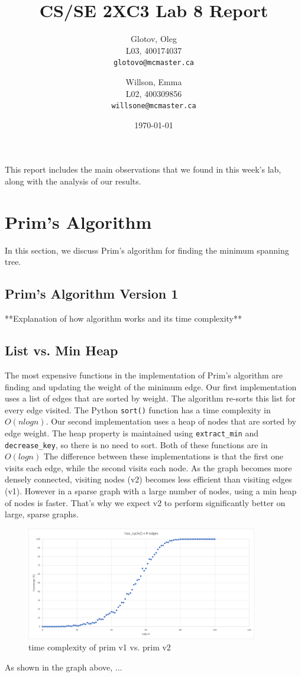 \documentclass[12pt]{article}
\title{CS/SE 2XC3 Lab 8 Report}
\author{
  Glotov, Oleg\\ L03, 400174037\\
  \texttt{glotovo@mcmaster.ca}
  \and
  Willson, Emma\\ L02, 400309856\\
  \texttt{willsone@mcmaster.ca}
  }
\date{\today}
\begin{document}
\maketitle

This report includes the main observations that we found in this week's lab, along with the analysis of our results.

\newpage 
\section{Prim's Algorithm}
In this section, we discuss Prim's algorithm for finding the minimum spanning tree. 
\subsection{Prim's Algorithm Version 1}
**Explanation of how algorithm works and its time complexity**
\subsection{List vs. Min Heap}
The most expensive functions in the implementation of Prim's algorithm are finding and updating the weight of the minimum edge. Our first implementation uses a list of edges that are sorted by weight. The algorithm re-sorts this list for every edge visited. The Python \verb+sort()+ function has a time complexity in $O(nlogn)$. Our second implementation uses a heap of nodes that are sorted by edge weight. The heap property is maintained using \verb+extract_min+ and \verb+decrease_key+, so there is no need to sort. Both of these functions are in $O(logn)$ The difference between these implementations is that the first one visits each edge, while the second visits each node. As the graph becomes more densely connected, visiting nodes (v2) becomes less efficient than visiting edges (v1). However in a sparse graph with a large number of nodes, using a min heap of nodes is faster. That's why we expect v2 to perform significantly better on large, sparse graphs.
\begin{figure}[H]
\centering
\includegraphics[width=0.9\textwidth,height=\textheight,keepaspectratio]{cycle}
\caption{time complexity of prim v1 vs. prim v2}
\label{Figure: m1}
\end{figure}
\noindent As shown in the graph above, ... 
\end{document}
